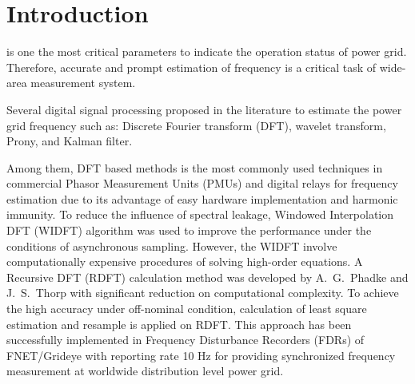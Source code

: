 \documentclass[journal,twoside]{IEEEtran}
\begin{document}
%
\IEEEpeerreviewmaketitle

\section{Introduction}
% 
% 
% 
% 

 is one the most critical parameters to indicate the operation status of  power grid. Therefore, accurate and prompt estimation of frequency is a critical task of wide-area measurement system.

Several digital signal processing   proposed  in the literature to estimate the power grid frequency such as: Discrete Fourier transform (DFT)\cite{7438889}, wavelet transform\cite{7981350}, Prony\cite{8263521}, and  Kalman filter\cite{Bagheri2016}.

Among them, DFT based methods is the most commonly
used techniques in commercial Phasor Measurement Units (PMUs) and digital relays for frequency estimation due to its advantage of easy hardware implementation and harmonic immunity\cite{7277049,5876287}. To reduce the influence of spectral leakage, Windowed Interpolation DFT (WIDFT) algorithm was used to improve the performance under the conditions of asynchronous sampling\cite{4956674}.
However, the WIDFT involve computationally expensive procedures of solving high-order equations.
A Recursive DFT (RDFT) calculation method was developed by A.~G.~Phadke and J.~S.~Thorp with significant reduction on computational complexity\cite{5519136}. To achieve the high accuracy under  off-nominal condition, calculation of least square estimation and resample is applied on RDFT\cite{chenjian}. This approach has been successfully implemented in  Frequency Disturbance
Recorders (FDRs) of FNET/Grideye with reporting rate 10 Hz for providing synchronized frequency measurement at worldwide distribution level power grid\cite{7265090}.
\end{document}
